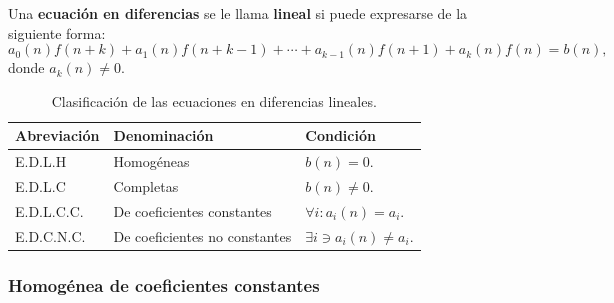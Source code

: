 \begin{frame}
\frametitle{\subsubsecname}

\begin{definition}
	Una \textbf{ecuación en diferencias} se le llama \textbf{lineal} si puede expresarse de la siguiente forma:
	\begin{equation}\label{eq:edl}
		a_{0}(n)f\left(n+k\right)+a_{1}(n)f\left(n+k-1\right)+\cdots+a_{k-1}(n)f\left(n+1\right)+a_{k}(n)f\left(n\right)=b\left(n\right), 
	\end{equation}
	donde $a_{k}(n)\neq0$.
\end{definition}

\begin{table}
	\caption{Clasificación de las ecuaciones en diferencias lineales.}
	\small
	\begin{tabular}{lll}
		\toprule
		Abreviación										& Denominación									& Condición\\
		\midrule
		\rowcolor{green!40} E.D.L.H		& Homogéneas										& $b(n)=0$.\\
		E.D.L.C												& Completas											& $b(n)\neq0$.\\
		\rowcolor{green!40} E.D.L.C.C.& De coeficientes constantes		& $\forall i: a_{i}(n)=a_{i}$.\\
		E.D.C.N.C.										& De coeficientes no constantes	& $\exists i\ni a_{i}(n)\neq a_{i}$.\\
		\bottomrule
	\end{tabular}
\end{table}

\end{frame}

\subsubsection{Homogénea de coeficientes constantes}


